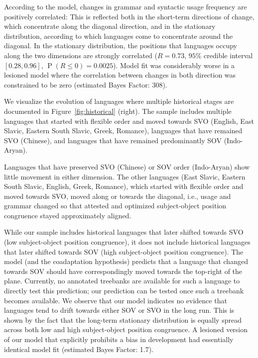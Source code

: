 \documentclass[9pt,twocolumn,twoside,lineno]{pnas-new}
\begin{document}
According to the model, changes in grammar and syntactic usage frequency are positively correlated:
This is reflected both in the short-term directions of change, which concentrate along the diagonal direction, and in the stationary distribution, according to which languages come to concentrate around the diagonal.
In the stationary distribution, the positions that languages occupy along the two dimensions are strongly correlated ($R=0.73$, $95\%$ credible interval $[0.28, 0.96]$, $\operatorname{P}(R\leq 0) = 0.0025$). %
Model fit was considerably worse in a lesioned model where the correlation between changes in both direction was constrained to be zero (estimated Bayes Factor: 308). %



We visualize the evolution of languages where multiple historical stages are documented in Figure~\ref{fig:historical} (right).
The sample includes multiple languages that started with flexible order and moved towards SVO (English, East Slavic, Eastern South Slavic, Greek, Romance), languages that have remained SVO (Chinese), and languages that have remained predominantly SOV (Indo-Aryan).

Languages that have preserved SVO (Chinese) or SOV order (Indo-Aryan) show little movement in either dimension.
The other languages (East Slavic, Eastern South Slavic, English, Greek, Romance), which started with flexible order and moved towards SVO, moved along or towards the diagonal, i.e., usage and grammar changed so that attested and optimized subject-object position congruence stayed approximately aligned.


While our sample includes historical languages that later shifted towards SVO (low subject-object position congruence), it does not include historical languages that later shifted towards SOV (high subject-object position congruence).
The model (and the coadaptation hypothesis) predicts that a language that changed towards SOV should have correspondingly moved towards the top-right of the plane. 
Currently, no annotated treebanks are available for such a language to directly test this prediction; our prediction can be tested once such a treebank becomes available.
We observe that our model indicates no evidence that languages tend to drift towards either SOV or SVO in the long run.
This is shown by the fact that the long-term stationary distribution is equally spread across both low and high subject-object position congruence.
A lesioned version of our model that explicitly prohibits a bias in development had essentially identical model fit (estimated Bayes Factor: 1.7). %
\end{document}

